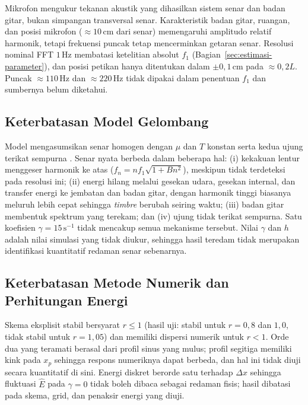 \documentclass[aps,prl,twocolumn,superscriptaddress]{revtex4-2}
\begin{document}
Mikrofon mengukur tekanan akustik yang dihasilkan sistem senar dan badan gitar, bukan simpangan transversal senar. 
Karakteristik badan gitar, ruangan, dan posisi mikrofon ($\approx10\,\mathrm{cm}$ dari senar) memengaruhi amplitudo relatif harmonik, tetapi frekuensi puncak tetap mencerminkan getaran senar. 
Resolusi nominal FFT $1\,\mathrm{Hz}$ membatasi ketelitian absolut $f_1$ (Bagian~\ref{sec:estimasi-parameter}), dan posisi petikan hanya ditentukan dalam $\pm0{,}1\,\mathrm{cm}$ pada $\approx0{,}2L$. 
Puncak $\approx110\,\mathrm{Hz}$ dan $\approx220\,\mathrm{Hz}$ tidak dipakai dalam penentuan $f_1$ dan sumbernya belum diketahui.

\subsection{Keterbatasan Model Gelombang}

Model mengasumsikan senar homogen dengan $\mu$ dan $T$ konstan serta kedua ujung terikat sempurna \cite{FletcherRossing1998}. 
Senar nyata berbeda dalam beberapa hal: (i) kekakuan lentur menggeser harmonik ke atas ($f_n=nf_1\sqrt{1+Bn^2}$), meskipun tidak terdeteksi pada resolusi ini; (ii) energi hilang melalui gesekan udara, gesekan internal, dan transfer energi ke jembatan dan badan gitar, dengan harmonik tinggi biasanya meluruh lebih cepat sehingga \textit{timbre} berubah seiring waktu; (iii) badan gitar membentuk spektrum yang terekam; dan (iv) ujung tidak terikat sempurna. 
Satu koefisien $\gamma=15\,\mathrm{s}^{-1}$ tidak mencakup semua mekanisme tersebut. 
Nilai $\gamma$ dan $h$ adalah nilai simulasi yang tidak diukur, sehingga hasil teredam tidak merupakan identifikasi kuantitatif redaman senar sebenarnya.

\subsection{Keterbatasan Metode Numerik dan Perhitungan Energi}

Skema eksplisit stabil bersyarat $r\leq1$ (hasil uji: stabil untuk $r=0{,}8$ dan $1{,}0$, tidak stabil untuk $r=1{,}05$) dan memiliki dispersi numerik untuk $r<1$. 
Orde dua yang teramati berasal dari profil sinus yang mulus; profil segitiga memiliki kink pada $x_p$ sehingga respons numeriknya dapat berbeda, dan hal ini tidak diuji secara kuantitatif di sini. 
Energi diskret berorde satu terhadap $\Delta x$ sehingga fluktuasi $\widehat{E}$ pada $\gamma=0$ tidak boleh dibaca sebagai redaman fisis; hasil dibatasi pada skema, grid, dan penaksir energi yang diuji.
\end{document}

